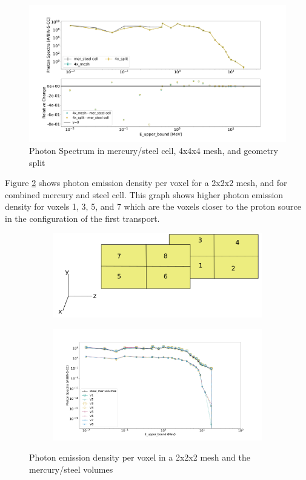 \begin{figure}[H]
 \centering
 \includegraphics[scale=0.42,trim={2cm 0.5cm 3cm 2cm},clip]{../figs/toy_p2/spec_VPII_4x.pdf}
 \caption{Photon Spectrum in mercury/steel cell, 4x4x4 mesh, and geometry split}
 \label{fig:2spec_cell_4x}
\end{figure}
%
Figure \ref{fig:2spec_8v} shows photon emission density per voxel for a
2x2x2 mesh, and for combined mercury and steel cell. This graph shows higher
photon emission density for voxels 1, 3, 5, and 7 which are the voxels closer
to the proton source in the configuration of the first transport.
\begin{figure}[H]
        \begin{subfigure}[t]{1.0\textwidth}
                \hfill
                \includegraphics[scale=0.4, trim={0cm 0cm 0cm 0cm},clip]{../figs/voxels.png}
        \end{subfigure}\hfill
        \begin{subfigure}[t]{1.0\textwidth}
                \centering
                \includegraphics[scale=0.4, trim={2.5cm 1cm 3cm 3cm},clip]{../figs/toy_p2/spec_VPII_8.pdf}
        \end{subfigure}
        \caption{Photon emission density per voxel in a 2x2x2 mesh and the mercury/steel volumes}
        \label{fig:2spec_8v}
\end{figure}
